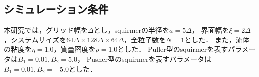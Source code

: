 \subsection{シミュレーション条件}
\label{sec:condition}
本研究では，グリッド幅を$\Delta$とし，squirmerの半径を$a = 5 \Delta$，
界面幅を$\xi = 2 \Delta$，システムサイズを$64 \Delta \times 128 \Delta \times 64 \Delta$，全粒子数を$N = 1$とした．
また，流体の粘度を$\eta = 1.0$，質量密度を$\rho = 1.0$とした．
Puller型のsquirmerを表すパラメータは$B_1 = 0.01, B_2 = 5.0$，
Pusher型のsquirmerを表すパラメータは$B_1 = 0.01, B_2 = -5.0$とした．
